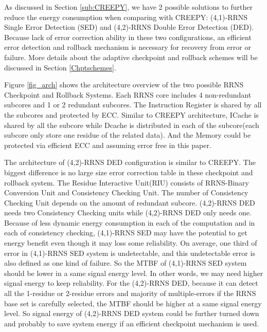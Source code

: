 \documentclass{sig-alternate}
\begin{document}
As discussed in Section \ref{sub:CREEPY}, we have 2 possible solutions to further reduce the energy consumption when comparing with CREEPY: (4,1)-RRNS Single Error Detection (SED) and (4,2)-RRNS Double Error Detection (DED). Because lack of error correction ability in these two configurations, an efficient error detection and rollback mechanism is necessary for recovery from error or failure. More details about the adaptive checkpoint and rollback schemes will be discussed in Section \ref{Chptschemes}. 

Figure \ref{fig_arch} shows the architecture overview of the two possible RRNS Checkpoint and Rollback Systems. Each RRNS core includes 4 non-redundant subcores and 1 or 2 redundant subcores. The Instruction Register is shared by all the subcores and protected by ECC. Similar to CREEPY architecture, ICache is shared by all the subcore while Dcache is distributed in each of the subcore(each subcore only store one residue of the related data). And the Memory could be protected via efficient ECC and assuming error free in this paper. 

The architecture of (4,2)-RRNS DED configuration is similar to CREEPY. The biggest difference is no large size error correction table in these checkpoint and rollback system. The Residue Interactive Unit(RIU) consists of RRNS-Binary Conversion Unit and Consistency Checking Unit. The number of Consistency Checking Unit depends on the amount of redundant subcore.  (4,2)-RRNS DED needs two Consistency Checking units while 
 (4,2)-RRNS DED only needs one. Because of less dynamic energy consumption in each of the computation and in each of consistency checking,  (4,1)-RRNS SED may have the potential to get energy benefit even though it may loss some reliability. On average, one third of error in (4,1)-RRNS SED system is undetectable, and this undetectable error is also defined as one kind of failure. So the MTBF of (4,1)-RRNS SED system should be lower in a same signal energy level. In other words, we may need higher signal energy to keep reliability. For the (4,2)-RRNS DED, because it can detect all the 1-residue or 2-residue errors and majority of multiple-errors if the RRNS base set is carefully selected, the MTBF should be higher at a same signal energy level. So signal energy of (4,2)-RRNS DED system could be further turned down and probably to save system energy if an efficient checkpoint mechanism is used. 
\end{document}
